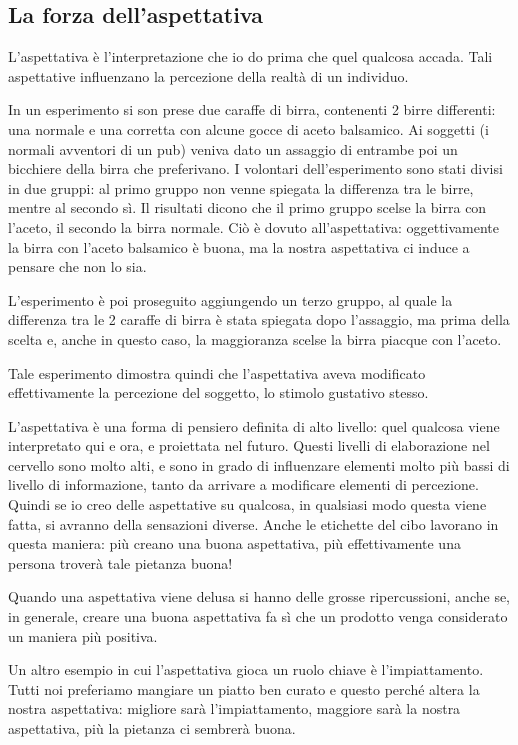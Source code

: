 \subsection{La forza dell'aspettativa}

L'aspettativa è l'interpretazione che io do prima che quel qualcosa accada.
Tali aspettative influenzano la percezione della realtà di un individuo.

In un esperimento si son prese due caraffe di birra, contenenti 2 birre
differenti: una normale e una corretta con alcune gocce di aceto balsamico.
Ai soggetti (i normali avventori di un pub) veniva dato un assaggio di entrambe
poi un bicchiere della birra che preferivano.
I volontari dell'esperimento sono stati divisi in due gruppi: al primo gruppo
non venne spiegata la differenza tra le birre, mentre al secondo sì. Il
risultati dicono che il primo gruppo scelse la birra con l'aceto, il secondo la
birra normale. Ciò è dovuto all'aspettativa: oggettivamente la birra con
l'aceto balsamico è buona, ma la nostra aspettativa ci induce a pensare che non
lo sia.

L'esperimento è poi proseguito aggiungendo un terzo gruppo, al quale la
differenza tra le 2 caraffe di birra è stata spiegata dopo l'assaggio, ma
prima della scelta e, anche in questo caso, la maggioranza scelse la birra
piacque con l'aceto.

Tale esperimento dimostra quindi che l'aspettativa aveva modificato
effettivamente la percezione del soggetto, lo stimolo gustativo stesso.

L'aspettativa è una forma di pensiero definita di alto livello: quel qualcosa
viene interpretato qui e ora, e proiettata nel futuro. Questi livelli di
elaborazione nel cervello sono molto alti, e sono in grado di influenzare
elementi molto più bassi di livello di informazione, tanto da arrivare a
modificare elementi di percezione. Quindi se io creo delle aspettative su
qualcosa, in qualsiasi modo questa viene fatta, si avranno della sensazioni
diverse. Anche le etichette del cibo lavorano in questa maniera: più creano una
buona aspettativa, più effettivamente una persona troverà tale pietanza buona!

Quando una aspettativa viene delusa si hanno delle grosse ripercussioni, anche
se, in generale, creare una buona aspettativa fa sì che un prodotto venga
considerato un maniera più positiva.

Un altro esempio in cui l'aspettativa gioca un ruolo chiave è l'impiattamento.
Tutti noi preferiamo mangiare un piatto ben curato e questo perché altera la
nostra aspettativa: migliore sarà l'impiattamento, maggiore sarà la nostra
aspettativa, più la pietanza ci sembrerà buona.

